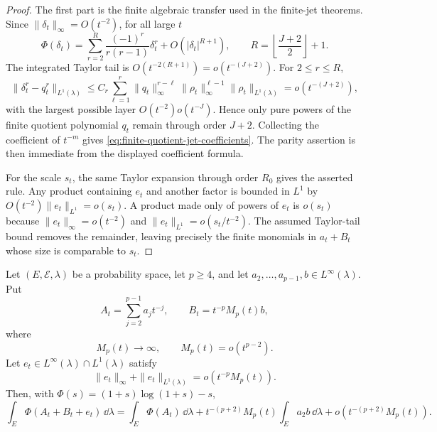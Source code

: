 \begin{proof}
The first part is the finite algebraic transfer used in the finite-jet
theorems.  Since \(\|\delta_t\|_\infty=O(t^{-2})\), for all large \(t\)
\[
\Phi(\delta_t)=
\sum_{r=2}^{R}\frac{(-1)^r}{r(r-1)}\delta_t^r
+O(|\delta_t|^{R+1}),
\qquad
R=\left\lfloor\frac{J+2}{2}\right\rfloor+1 .
\]
The integrated Taylor tail is
\(O(t^{-2(R+1)})=o(t^{-(J+2)})\).  For \(2\le r\le R\),
\[
\|\delta_t^r-q_t^r\|_{L^1(\lambda)}
\le
C_r\sum_{\ell=1}^{r}
\|q_t\|_\infty^{r-\ell}
\|\rho_t\|_\infty^{\ell-1}
\|\rho_t\|_{L^1(\lambda)}
=o(t^{-(J+2)}),
\]
with the largest possible layer \(O(t^{-2})o(t^{-J})\).  Hence only pure
powers of the finite quotient polynomial \(q_t\) remain through order
\(J+2\).  Collecting the coefficient of \(t^{-m}\) gives
\eqref{eq:finite-quotient-jet-coefficients}.  The parity assertion is then
immediate from the displayed coefficient formula.

For the scale \(s_t\), the same Taylor expansion through order \(R_0\) gives
the asserted rule.
Any product containing \(e_t\) and another factor is bounded in \(L^1\) by
\(O(t^{-2})\|e_t\|_{L^1}=o(s_t)\).  A product made only of powers of \(e_t\)
is \(o(s_t)\) because \(\|e_t\|_\infty=o(t^{-2})\) and
\(\|e_t\|_{L^1}=o(s_t/t^{-2})\).  The assumed Taylor-tail bound removes the
remainder, leaving precisely the finite monomials in \(a_t+B_t\) whose size
is comparable to \(s_t\).
\end{proof}

\begin{lemma}%
\label{lem:moving-scale-taylor-transfer}
Let \((E,\mathcal E,\lambda)\) be a probability space, let \(p\ge4\), and let
\(a_2,\ldots,a_{p-1},b\in L^\infty(\lambda)\).  Put
\[
  A_t=\sum_{j=2}^{p-1}a_jt^{-j},\qquad
  B_t=t^{-p}M_p(t)b,
\]
where
\begin{equation}\label{eq:moving-scale-growth}
  M_p(t)\to\infty,\qquad M_p(t)=o(t^{p-2}).
\end{equation}
Let \(e_t\in L^\infty(\lambda)\cap L^1(\lambda)\) satisfy
\begin{equation}\label{eq:moving-scale-error}
  \|e_t\|_\infty+\|e_t\|_{L^1(\lambda)}
  =o(t^{-p}M_p(t)).
\end{equation}
Then, with \(\Phi(s)=(1+s)\log(1+s)-s\),
\begin{equation}\label{eq:moving-scale-transfer}
  \int_E\Phi(A_t+B_t+e_t)\,\dd\lambda
  =
  \int_E\Phi(A_t)\,\dd\lambda
  +t^{-(p+2)}M_p(t)\int_Ea_2b\,\dd\lambda
  +o(t^{-(p+2)}M_p(t)).
\end{equation}
\end{lemma}
